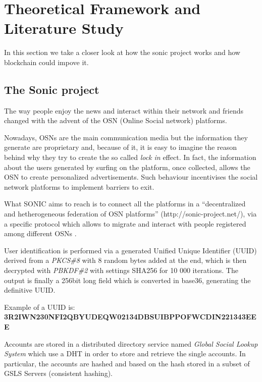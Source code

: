 \section{Theoretical Framework and Literature Study}
\label{S:2}

In this section we take a closer look at how the sonic project works and how blockchain could impove it. 

\subsection{The Sonic project}

The way people enjoy the news and interact within their network and friends changed with the advent of the OSN (Online Social network) platforms. \par
Nowadays, OSNs are the main communication media but the information they generate are proprietary and, because of it, it is easy to imagine the reason behind why they try to create the so called \textit{lock in} effect.
In fact, the information about the users generated by surfing on the platform, once collected, allows the OSN to create personalized advertisements. Such behaviour incentivises the social network platforms to implement barriers to exit. \par
What SONIC aims to reach is to connect all the platforms in a ``decentralized and hetherogeneous federation of OSN platforms'' (http://sonic-project.net/), via a specific protocol which allows to migrate and interact with people registered among different OSNs \cite{gondor_sonic:_2014}. \par
User identification is performed via a generated Unified Unique Identifier (UUID) derived from a \textit{PKCS\#8} \cite{pkcs8}with 8 random bytes added at the end, which is then decrypted with \textit{PBKDF\#2} \cite{pkcs8} with settings SHA256 \cite{hansen_us} for 10 000 iterations.
The output is finally a 256bit long field which is converted in base36, generating the definitive UUID. \par

Example of a UUID is: \\ \textbf{3R2IWN230NFI2QBYUDEQW02134DBSUIBPPOFWCDIN221343EEE}\cite{gondor_sonic:_2014} \par

Accounts are stored in a distributed directory service named \textit{Global Social Lookup System} which use a DHT in order to store and retrieve the single accounts. In particular, the accounts are hashed and based on the hash stored in a subset of GSLS Servers (consistent hashing). \par


